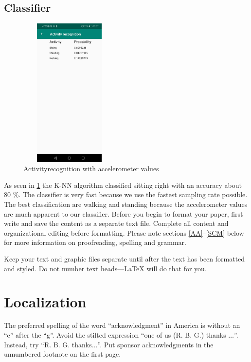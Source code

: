 \documentclass[conference]{IEEEtran}
\begin{document}
\subsection{Classifier}
\begin{figure}
\includegraphics[height = 7.5cm,width = 5cm]{Images/AcitivityRecognition.jpeg}
\centering
\caption{Activityrecognition with accelerometer values }
\label{fig:classifier}
\end{figure}
As seen in \ref{fig:classifier} the K-NN algorithm classified sitting right with an accuracy about 80 \%. The classifier is very fast because we use the fastest sampling rate possible. The best classification are walking and standing because the accelerometer values are much apparent to our classifier.
Before you begin to format your paper, first write and save the content as a 
separate text file. Complete all content and organizational editing before 
formatting. Please note sections \ref{AA}--\ref{SCM} below for more information on 
proofreading, spelling and grammar.

Keep your text and graphic files separate until after the text has been 
formatted and styled. Do not number text heads---{\LaTeX} will do that 
for you.


\section*{Localization}

The preferred spelling of the word ``acknowledgment'' in America is without 
an ``e'' after the ``g''. Avoid the stilted expression ``one of us (R. B. 
G.) thanks $\ldots$''. Instead, try ``R. B. G. thanks$\ldots$''. Put sponsor 
acknowledgments in the unnumbered footnote on the first page.
\end{document}
